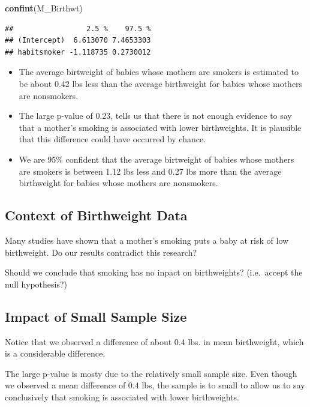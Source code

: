 \documentclass[]{book}
\newenvironment{Shaded}{\begin{snugshade}}{\end{snugshade}}
\newcommand{\KeywordTok}[1]{\textcolor[rgb]{0.13,0.29,0.53}{\textbf{#1}}}
\newcommand{\NormalTok}[1]{#1}
\begin{document}
\begin{Shaded}
\begin{Highlighting}[]
\KeywordTok{confint}\NormalTok{(M_Birthwt)}
\end{Highlighting}
\end{Shaded}

\begin{verbatim}
##                 2.5 %    97.5 %
## (Intercept)  6.613070 7.4653303
## habitsmoker -1.118735 0.2730012
\end{verbatim}

\begin{itemize}
\item
  The average birtweight of babies whose mothers are smokers is
  estimated to be about 0.42 lbs less than the average birthweight for
  babies whose mothers are nonsmokers.
\item
  The large p-value of 0.23, tells us that there is not enough evidence
  to say that a mother's smoking is associated with lower birthweights.
  It is plausible that this difference could have occurred by chance.
\item
  We are 95\% confident that the average birtweight of babies whose
  mothers are smokers is between 1.12 lbs less and 0.27 lbs more than
  the average birthweight for babies whose mothers are nonsmokers.
\end{itemize}

\subsection{Context of Birthweight
Data}\label{context-of-birthweight-data}

Many studies have shown that a mother's smoking puts a baby at risk of
low birthweight. Do our results contradict this research?

Should we conclude that smoking has no inpact on birthweights?
(i.e.~accept the null hypothesis?)

\subsection{Impact of Small Sample
Size}\label{impact-of-small-sample-size}

Notice that we observed a difference of about 0.4 lbs. in mean
birthweight, which is a considerable difference.

The large p-value is mosty due to the relatively small sample size. Even
though we observed a mean difference of 0.4 lbs, the sample is to small
to allow us to say conclusively that smoking is associated with lower
birthweights.
\end{document}
